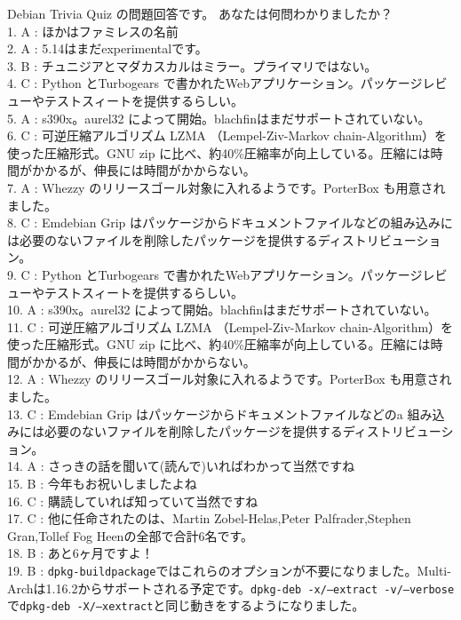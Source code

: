 \documentclass[mingoth,a4paper]{jsarticle}
\begin{document}
 Debian Trivia Quiz の問題回答です。
 あなたは何問わかりましたか？
 \\
1. A : ほかはファミレスの名前\\
2. A : 5.14はまだexperimentalです。\\
3. B : チュニジアとマダカスカルはミラー。プライマリではない。\\
4. C : Python とTurbogears で書かれたWebアプリケーション。パッケージレビューやテストスィートを提供するらしい。\\
5. A : s390x。aurel32 によって開始。blachfinはまだサポートされていない。\\
6. C : 可逆圧縮アルゴリズム LZMA （Lempel-Ziv-Markov chain-Algorithm）を使った圧縮形式。GNU zip に比べ、約40\%圧縮率が向上している。圧縮には時間がかかるが、伸長には時間がかからない。\\
7. A : Whezzy のリリースゴール対象に入れるようです。PorterBox も用意されました。\\
8. C : Emdebian Grip はパッケージからドキュメントファイルなどの組み込みには必要のないファイルを削除したパッケージを提供するディストリビューション。\\
9. C : Python とTurbogears で書かれたWebアプリケーション。パッケージレビューやテストスィートを提供するらしい。\\
10. A : s390x。aurel32 によって開始。blachfinはまだサポートされていない。\\
11. C : 可逆圧縮アルゴリズム LZMA （Lempel-Ziv-Markov chain-Algorithm）を使った圧縮形式。GNU zip に比べ、約40\%圧縮率が向上している。圧縮には時間がかかるが、伸長には時間がかからない。\\
12. A : Whezzy のリリースゴール対象に入れるようです。PorterBox も用意されました。\\
13. C : Emdebian Grip はパッケージからドキュメントファイルなどのa 組み込みには必要のないファイルを削除したパッケージを提供するディストリビューション。\\
14. A : さっきの話を聞いて(読んで)いればわかって当然ですね\\
15. B : 今年もお祝いしましたよね\\
16. C : 購読していれば知っていて当然ですね\\
17. C : 他に任命されたのは、Martin Zobel-Helas,Peter Palfrader,Stephen Gran,Tollef Fog Heenの全部で合計6名です。\\
18. B : あと6ヶ月ですよ！\\
19. B : \texttt{dpkg-buildpackage}ではこれらのオプションが不要になりました。Multi-Archは1.16.2からサポートされる予定です。\texttt{dpkg-deb -x/--extract -v/--verbose}で\texttt{dpkg-deb -X/--xextract}と同じ動きをするようになりました。\\
\end{document}
